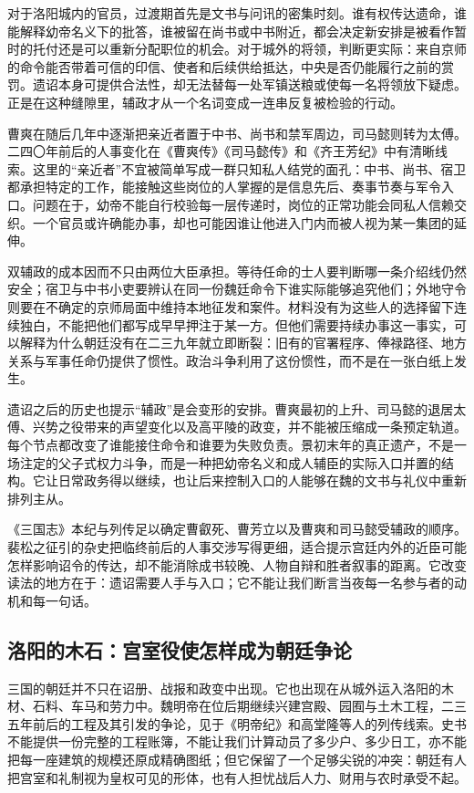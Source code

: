 对于洛阳城内的官员，过渡期首先是文书与问讯的密集时刻。谁有权传达遗命，谁能解释幼帝名义下的批答，谁被留在尚书或中书附近，都会决定新安排是被看作暂时的托付还是可以重新分配职位的机会。对于城外的将领，判断更实际：来自京师的命令能否带着可信的印信、使者和后续供给抵达，中央是否仍能履行之前的赏罚。遗诏本身可提供合法性，却无法替每一处军镇送粮或使每一名将领放下疑虑。正是在这种缝隙里，辅政才从一个名词变成一连串反复被检验的行动。

曹爽在随后几年中逐渐把亲近者置于中书、尚书和禁军周边，司马懿则转为太傅。二四〇年前后的人事变化在《曹爽传》《司马懿传》和《齐王芳纪》中有清晰线索。这里的“亲近者”不宜被简单写成一群只知私人结党的面孔：中书、尚书、宿卫都承担特定的工作，能接触这些岗位的人掌握的是信息先后、奏事节奏与军令入口。问题在于，幼帝不能自行校验每一层传递时，岗位的正常功能会同私人信赖交织。一个官员或许确能办事，却也可能因谁让他进入门内而被人视为某一集团的延伸。

双辅政的成本因而不只由两位大臣承担。等待任命的士人要判断哪一条介绍线仍然安全；宿卫与中书小吏要辨认在同一份魏廷命令下谁实际能够追究他们；外地守令则要在不确定的京师局面中维持本地征发和案件。材料没有为这些人的选择留下连续独白，不能把他们都写成早早押注于某一方。但他们需要持续办事这一事实，可以解释为什么朝廷没有在二三九年就立即断裂：旧有的官署程序、俸禄路径、地方关系与军事任命仍提供了惯性。政治斗争利用了这份惯性，而不是在一张白纸上发生。

遗诏之后的历史也提示“辅政”是会变形的安排。曹爽最初的上升、司马懿的退居太傅、兴势之役带来的声望变化以及高平陵的政变，并不能被压缩成一条预定轨道。每个节点都改变了谁能接住命令和谁要为失败负责。景初末年的真正遗产，不是一场注定的父子式权力斗争，而是一种把幼帝名义和成人辅臣的实际入口并置的结构。它让日常政务得以继续，也让后来控制入口的人能够在魏的文书与礼仪中重新排列主从。

\begin{debate}[裴注中的临终密议能说明什么？]
《三国志》本纪与列传足以确定曹叡死、曹芳立以及曹爽和司马懿受辅政的顺序。裴松之征引的杂史把临终前后的人事交涉写得更细，适合提示宫廷内外的近臣可能怎样影响诏令的传达，却不能消除成书较晚、人物自辩和胜者叙事的距离。它改变读法的地方在于：遗诏需要人手与入口；它不能让我们断言当夜每一名参与者的动机和每一句话。
\end{debate}

\subsection{洛阳的木石：宫室役使怎样成为朝廷争论}

三国的朝廷并不只在诏册、战报和政变中出现。它也出现在从城外运入洛阳的木材、石料、车马和劳力中。魏明帝在位后期继续兴建宫殿、园囿与土木工程，二三五年前后的工程及其引发的争论，见于《明帝纪》和高堂隆等人的列传线索。史书不能提供一份完整的工程账簿，不能让我们计算动员了多少户、多少日工，亦不能把每一座建筑的规模还原成精确图纸；但它保留了一个足够尖锐的冲突：朝廷有人把宫室和礼制视为皇权可见的形体，也有人担忧战后人力、财用与农时承受不起。

